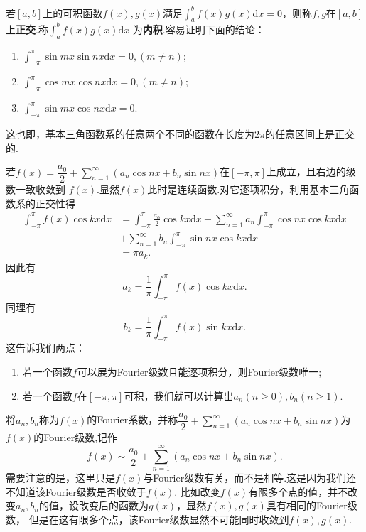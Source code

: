 \documentclass[UTF8]{article}
\newcommand{\dx}{\mathrm{d}x}
\begin{document}
  若$[a,b]$上的可积函数$f(x),g(x)$满足$\int_a^bf(x)g(x)\dx=0$，则称$f,g$在$[a,b]$上\textbf{正交}.称$\int_a^bf(x)g(x)\dx$
  为\textbf{内积}.容易证明下面的结论：
  \begin{enumerate}
    \item $\int_{-\pi}^\pi\sin mx\sin nx\dx=0,(m\ne n);$
    \item $\int_{-\pi}^\pi\cos mx\cos nx\dx=0,(m\ne n);$
    \item $\int_{-\pi}^\pi\sin mx\cos nx\dx=0.$
  \end{enumerate}
  这也即，基本三角函数系的任意两个不同的函数在长度为$2\pi$的任意区间上是正交的.

  若$f(x)=\dfrac{a_0}{2}+\sum\limits_{n=1}^\infty(a_n\cos nx+b_n\sin nx)$在$[-\pi,\pi]$上成立，且右边的级数一致收敛到
  $f(x)$.显然$f(x)$此时是连续函数.对它逐项积分，利用基本三角函数系的正交性得
  \begin{align*}
    \int_{-\pi}^\pi f(x)\cos kx\dx&=\int_{-\pi}^\pi \frac{a_0}{2}\cos kx\dx+\sum_{n=1}^\infty a_n\int_{-\pi}^\pi
    \cos nx\cos kx\dx\\
    &+\sum_{n=1}^\infty b_n\int_{-\pi}^\pi\sin nx\cos kx\dx\\
    &=\pi a_k.
  \end{align*}
  因此有
  $$a_k=\frac{1}{\pi}\int_{-\pi}^\pi f(x)\cos kx\dx.$$
  同理有
  $$b_k=\frac{1}{\pi}\int_{-\pi}^\pi f(x)\sin kx\dx.$$
  这告诉我们两点：
  \begin{enumerate}
    \item 若一个函数$f$可以展为Fourier级数且能逐项积分，则Fourier级数唯一;
    \item 若一个函数$f$在$[-\pi,\pi]$可积，我们就可以计算出$a_n(n\ge 0),b_n(n\ge 1).$
  \end{enumerate}
  将$a_n,b_n$称为$f(x)$的Fourier系数，并称$\dfrac{a_0}{2}+\sum\limits_{n=1}^\infty(a_n\cos nx+b_n\sin nx)$为
  $f(x)$的Fourier级数,记作
  $$f(x)\sim \dfrac{a_0}{2}+\sum\limits_{n=1}^\infty(a_n\cos nx+b_n\sin nx).$$
  需要注意的是，这里只是$f(x)$与Fourier级数有关，而不是相等.这是因为我们还不知道该Fourier级数是否收敛于$f(x)$.
  比如改变$f(x)$有限多个点的值，并不改变$a_n,b_n$的值，设改变后的函数为$g(x)$，显然$f(x),g(x)$具有相同的Fourier级数，
  但是在这有限多个点，该Fourier级数显然不可能同时收敛到$f(x),g(x)$.
\end{document}
